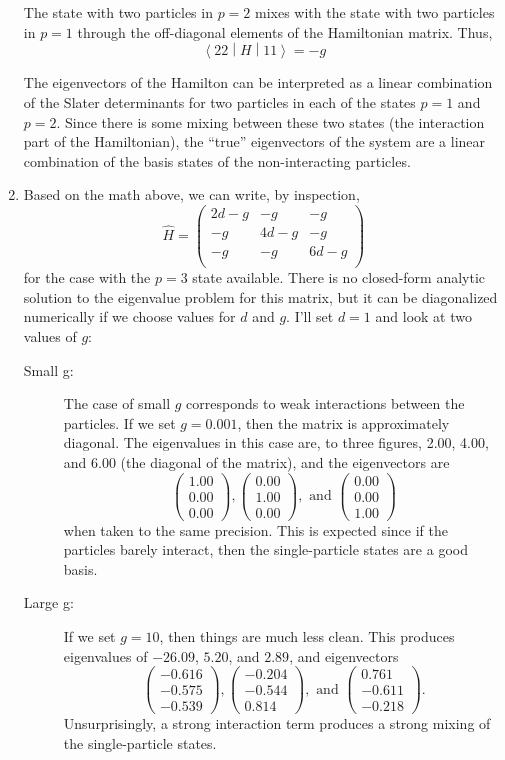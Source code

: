 \documentclass{article}
\newcommand{\mel}[3]{\ensuremath{\left<#1 \middle| #2 \middle| #3 \right>}}
\newcommand{\pmat}[1]{\ensuremath{\begin{pmatrix}#1\end{pmatrix}}}
\begin{document}
\begin{enumerate}
		The state with two particles in $p=2$ mixes with the state with two particles in $p=1$ through the off-diagonal elements of the Hamiltonian matrix. Thus, 
		\begin{equation}
			\boxed{\mel{22}{H}{11} = -g}
		\end{equation}

		The eigenvectors of the Hamilton can be interpreted as a linear combination of the Slater determinants for two particles in each of the states $p=1$ and $p=2$. Since there is some mixing between these two states (the interaction part of the Hamiltonian), the ``true'' eigenvectors of the system are a linear combination of the basis states of the non-interacting particles.

		\item Based on the math above, we can write, by inspection,
		\begin{equation}
			\hat H = \begin{pmatrix}
				2d-g & -g & -g \\
				-g & 4d-g & -g \\
				-g & -g & 6d-g \\
			\end{pmatrix}
		\end{equation}
		for the case with the $p=3$ state available. There is no closed-form analytic solution to the eigenvalue problem for this matrix, but it can be diagonalized numerically if we choose values for $d$ and $g$. I'll set $d=1$ and look at two values of $g$:
		\begin{description}
			\item[Small g:] The case of small $g$ corresponds to weak interactions between the particles. If we set $g=0.001$, then the matrix is approximately diagonal. The eigenvalues in this case are, to three figures, 2.00, 4.00, and 6.00 (the diagonal of the matrix), and the eigenvectors are 
			\[
				\pmat{1.00\\0.00\\0.00}, \pmat{0.00\\1.00\\0.00},\text{\ and\ } \pmat{0.00\\0.00\\1.00}
			\]
			when taken to the same precision. This is expected since if the particles barely interact, then the single-particle states are a good basis.

			\item[Large g:] If we set $g=10$, then things are much less clean. This produces eigenvalues of $-26.09$, $5.20$, and $2.89$, and eigenvectors
			\[
				\pmat{-0.616\\-0.575\\-0.539}, \pmat{-0.204\\-0.544\\0.814},\text{\ and\ } \pmat{0.761\\-0.611\\-0.218}.
			\]
			Unsurprisingly, a strong interaction term produces a strong mixing of the single-particle states.
		\end{description}
	\end{enumerate}
\end{document}
